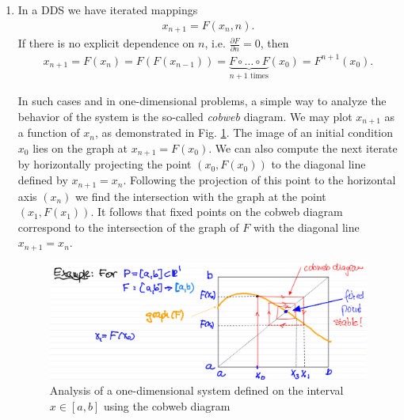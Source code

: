 \begin{enumerate}
	\item In a DDS we have iterated mappings 
	\begin{align}
		\boxed{ {x}_{n+1} = F( {x}_n , n).}	
	\end{align}
	If there is no explicit dependence on $n$, i.e. $\frac{\partial F}{\partial n} = 0$, then 
	\begin{align}
		\boxed{  {x}_{n+1}=F( {x}_n) = F(F( {x}_{n-1})) = \underbrace{F \circ \ldots \circ F}_{n+1 \textrm{ times} }( {x}_0) = F^{n+1}( {x}_0).}
	\end{align}
\begin{ex}
	In such cases and in one-dimensional problems, a simple way to analyze the behavior of the system is the so-called \textit{cobweb} diagram. We may plot $x_{n+1}$ as a function of $x_{n}$, as demonstrated in Fig. \ref{fig:cobweb}. The image of an initial condition $x_0$ lies on the graph at $x_{n+1}=F(x_0)$. We can also compute the next iterate by horizontally projecting the point $(x_0, F(x_0))$ to the diagonal line defined by $x_{n+1}= x_n$. Following the projection of this point to the horizontal axis $(x_n)$ we find the intersection with the graph at the point $(x_1, F(x_1))$. It follows that fixed points on the cobweb diagram correspond to the intersection of the graph of $F$ with the diagonal line $x_{n+1}= x_n$.
	\begin{figure}[h!]
	\centering
	\includegraphics[width = \textwidth]{figures/intro/1DDS.png}
	\caption{Analysis of a one-dimensional system defined on the interval $x\in [a,b]$ using the cobweb diagram} \label{fig:cobweb}
\end{figure}
\end{ex}


\end{enumerate}
